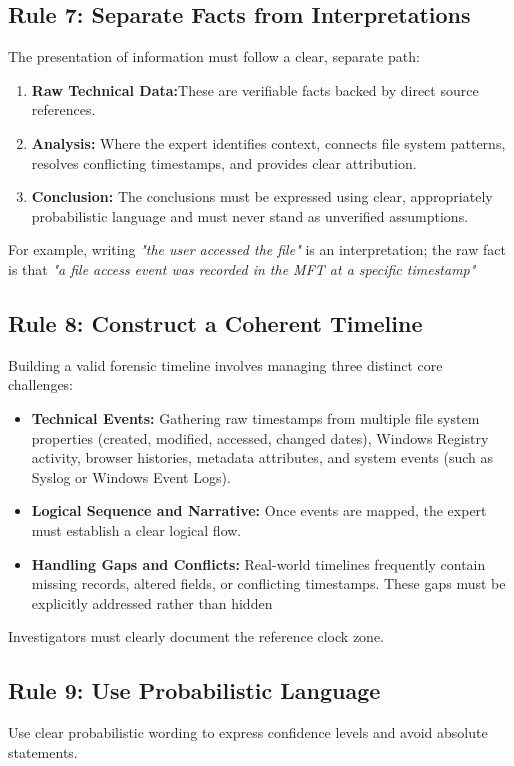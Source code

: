 \subsection{Rule 7: Separate Facts from Interpretations}

The presentation of information must follow a clear, separate path:
\begin{enumerate}
    \item \textbf{Raw Technical Data:}These are verifiable facts backed by direct source references.
    \item \textbf{Analysis:} Where the expert identifies context, connects file system patterns, resolves conflicting timestamps, and provides clear attribution.
    \item \textbf{Conclusion:} 
    The conclusions must be expressed using clear, appropriately probabilistic language and must never stand as unverified assumptions.
\end{enumerate}
For example, writing \textit{"the user accessed the file"} is an interpretation; the raw fact is that \textit{"a file access event was recorded in the MFT at a specific timestamp"}
\subsection{Rule 8: Construct a Coherent Timeline}

Building a valid forensic timeline involves managing three distinct core challenges:
\begin{itemize}
    \item \textbf{Technical Events:} Gathering raw timestamps from multiple file system properties (created, modified, accessed, changed dates), Windows Registry activity, browser histories, metadata attributes, and system events (such as Syslog or Windows Event Logs).
    \item \textbf{Logical Sequence and Narrative:} Once events are mapped, the expert must establish a clear logical flow.
    \item \textbf{Handling Gaps and Conflicts:} Real-world timelines frequently contain missing records, altered fields, or conflicting timestamps. These gaps must be explicitly addressed rather than hidden
\end{itemize}
Investigators must clearly document the reference clock zone.


\subsection{Rule 9: Use Probabilistic Language}
Use clear probabilistic wording to express confidence levels and avoid absolute statements.

